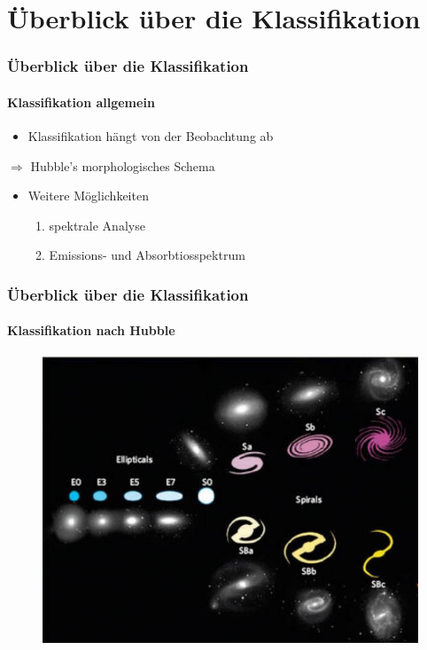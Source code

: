 








\begin{frame}
\titlepage
\end{frame}



\begin{frame}
\tableofcontents
\end{frame}


\section{Überblick über die Klassifikation}

\begin{frame}
\frametitle{Überblick über die Klassifikation}
\framesubtitle{Klassifikation allgemein}

\begin{itemize}
\item Klassifikation hängt von der Beobachtung ab
\end{itemize}
\qquad $\Rightarrow$ Hubble's morphologisches Schema



\begin{itemize}
\item Weitere Möglichkeiten
\begin{enumerate}
\item spektrale Analyse
\item Emissions- und Absorbtiosspektrum
\end{enumerate}
\end{itemize}

\end{frame}


\begin{frame}
\frametitle{Überblick über die Klassifikation}
\framesubtitle{Klassifikation nach Hubble}
\begin{figure}
\includegraphics[scale=0.5]{Hubble_Entwicklung.jpg}
\end{figure}
\end{frame}


